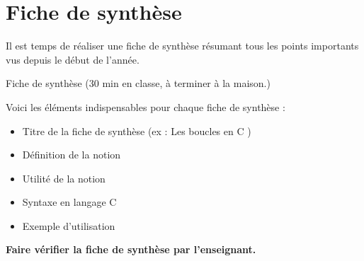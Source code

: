 \UPSTIactiviteStyleCadre
\section{Fiche de synthèse}

Il est temps de réaliser une fiche de synthèse résumant tous les points importants vus depuis le début de l'année.

\begin{UPSTIactivite}{Fiche de synthèse (30 min en classe, à terminer à la maison.)}

    Voici les éléments indispensables pour chaque fiche de synthèse :
    \begin{itemize}
        \item Titre de la fiche de synthèse (ex : \og Les boucles en C \fg)
        \item Définition de la notion
        \item Utilité de la notion
        \item Syntaxe en langage C
        \item Exemple d'utilisation
    \end{itemize}

    \textbf{Faire vérifier la fiche de synthèse par l'enseignant.}
\end{UPSTIactivite}
